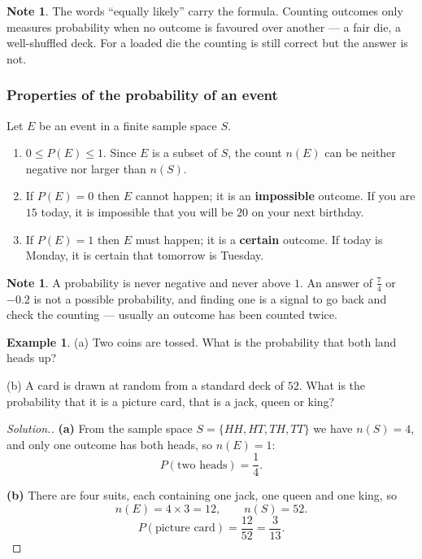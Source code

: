 \documentclass[11pt,a4paper]{article}
\theoremstyle{definition}
\newtheorem{example}[thm]{Example}
\newtheorem{note}[thm]{Note}
\newenvironment{solution}
  {\renewcommand{\qedsymbol}{}\begin{proof}[\textit{Solution}.]}
  {\end{proof}}
\begin{document}
\begin{note}
The words ``equally likely'' carry the formula. Counting outcomes only measures
probability when no outcome is favoured over another --- a fair die, a well-shuffled
deck. For a loaded die the counting is still correct but the answer is not.
\end{note}

\subsubsection{Properties of the probability of an event}

Let $E$ be an event in a finite sample space $S$.

\begin{enumerate}
\item[(i).] $0\leq P(E)\leq 1$. Since $E$ is a subset of $S$, the count $n(E)$ can be
neither negative nor larger than $n(S)$.
\item[(ii).] If $P(E)=0$ then $E$ cannot happen; it is an \textbf{impossible} outcome. If
you are $15$ today, it is impossible that you will be $20$ on your next birthday.
\item[(iii).] If $P(E)=1$ then $E$ must happen; it is a \textbf{certain} outcome. If today
is Monday, it is certain that tomorrow is Tuesday.
\end{enumerate}

\begin{note}
A probability is never negative and never above $1$. An answer of $\frac{7}{4}$ or
$-0.2$ is not a possible probability, and finding one is a signal to go back and check
the counting --- usually an outcome has been counted twice.
\end{note}

\begin{example}
(a) Two coins are tossed. What is the probability that both land heads up?

(b) A card is drawn at random from a standard deck of $52$. What is the probability that
it is a picture card, that is a jack, queen or king?
\end{example}

\begin{solution}
\textbf{(a)} From the sample space $S=\{HH,HT,TH,TT\}$ we have $n(S)=4$, and only one
outcome has both heads, so $n(E)=1$:
$$P(\text{two heads})=\frac{1}{4}.$$

\textbf{(b)} There are four suits, each containing one jack, one queen and one king, so
$$n(E)=4\times 3=12,\qquad n(S)=52.$$
$$P(\text{picture card})=\frac{12}{52}=\frac{3}{13}.$$
\end{solution}
\end{document}
